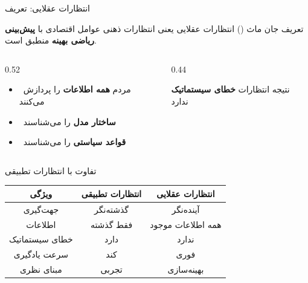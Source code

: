 \documentclass[aspectratio=169,11pt]{beamer}
\newcommand{\highlight}[1]{\textcolor{AccentOrange}{\textbf{#1}}}
\newcommand{\keyword}[1]{\textcolor{MainBlue}{\textbf{#1}}}
\begin{document}
\begin{frame}{انتظارات عقلایی: تعریف}
	\begin{block}{تعریف جان ماث ()}
		انتظارات عقلایی یعنی انتظارات ذهنی عوامل اقتصادی با \highlight{پیش‌بینی ریاضی بهینه} منطبق است.
	\end{block}
	\vspace{0.3cm}
	\begin{LTR}
		\begin{columns}[T]
			\begin{column}{0.52\textwidth}
				\begin{RTL}
					\begin{itemize}
						\item \faCheckCircle\ مردم \keyword{همه اطلاعات} را پردازش می‌کنند
						\item \faCheckCircle\ \keyword{ساختار مدل} را می‌شناسند
						\item \faCheckCircle\ \keyword{قواعد سیاستی} را می‌شناسند
					\end{itemize}
				\end{RTL}
			\end{column}
			\hfill
			\begin{column}{0.44\textwidth}
				\begin{RTL}
					\begin{exampleblock}{نتیجه}
						انتظارات \highlight{خطای سیستماتیک} ندارد
					\end{exampleblock}
				\end{RTL}
			\end{column}
		\end{columns}
	\end{LTR}
\end{frame}

\begin{frame}{تفاوت با انتظارات تطبیقی}
	\begin{center}
		\renewcommand{\arraystretch}{1.4}
		\begin{tabular}{ccc}
			\toprule
			\textbf{ویژگی} & \textbf{\textcolor{AlertRed}{انتظارات تطبیقی}} & \textbf{\textcolor{SuccessGreen}{انتظارات عقلایی}} \\
			\midrule
			جهت‌گیری        & گذشته‌نگر                                       & آینده‌نگر                                           \\
			اطلاعات        & فقط گذشته                                      & همه اطلاعات موجود                                  \\
			خطای سیستماتیک & دارد                                           & ندارد                                              \\
			سرعت یادگیری   & کند                                            & فوری                                               \\
			مبنای نظری     & تجربی                                          & بهینه‌سازی                                          \\
			\bottomrule
		\end{tabular}
	\end{center}
\end{frame}
\end{document}
